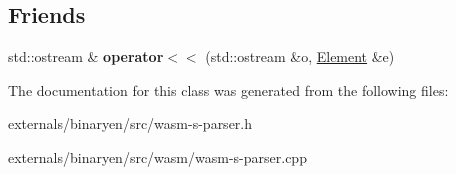 \subsection*{Friends}
\begin{DoxyCompactItemize}
\item 
\mbox{\label{classwasm_1_1_element_a938547945e9dfd6362edea1db9a3c1dd}} 
std\+::ostream \& {\bfseries operator$<$$<$} (std\+::ostream \&o, \mbox{\hyperlink{classwasm_1_1_element}{Element}} \&e)
\end{DoxyCompactItemize}


The documentation for this class was generated from the following files\+:\begin{DoxyCompactItemize}
\item 
externals/binaryen/src/wasm-\/s-\/parser.\+h\item 
externals/binaryen/src/wasm/wasm-\/s-\/parser.\+cpp\end{DoxyCompactItemize}
